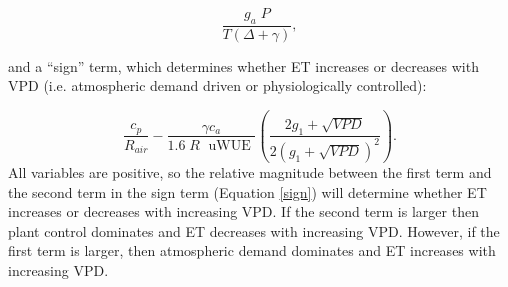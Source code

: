 \documentclass[draft,linenumbers]{agujournal}
\begin{document}
\begin{equation} \frac{g_a \; P}{T(\Delta + \gamma)},
\end{equation}

and a ``sign'' term, which determines whether ET increases or
decreases with VPD (i.e. atmospheric demand driven or physiologically
controlled):

\begin{equation}
  \label{sign} \frac{c_p}{R_{air}} - \frac{\gamma c_a }{1.6 \; R\;
\text{ uWUE }} \left( \frac{2 g_1 + \sqrt{VPD}}{2 (g_1 +
\sqrt{VPD})^2}\right).
\end{equation} All variables are positive, so the relative magnitude
between the first term and the second term in the sign term (Equation
\ref{sign}) will determine whether ET increases or decreases with
increasing VPD. If the second term is larger then plant control
dominates and ET decreases with increasing VPD. However, if the first
term is larger, then atmospheric demand dominates and ET increases
with increasing VPD.
\end{document}
